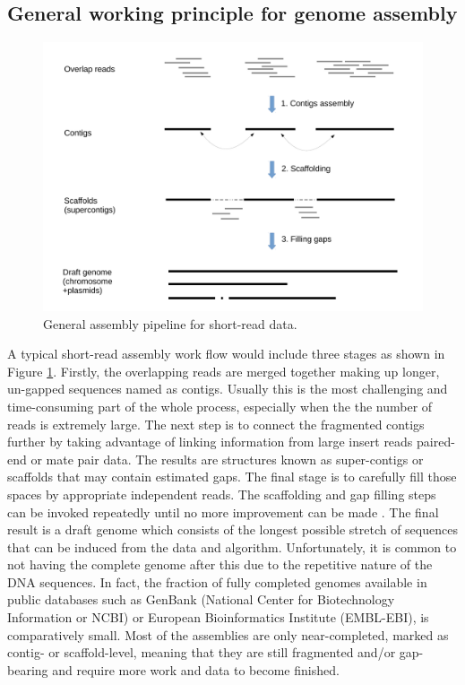 \subsection{General working principle for genome assembly}

\begin{figure}[ht!]
\centering
\includegraphics[width=.9\textwidth]{images/sassembly.pdf}
\caption{General assembly pipeline for short-read data.}
\label{Fig:assembly}
\end{figure}

A typical short-read assembly work flow would include three stages as shown in Figure \ref{Fig:assembly}. Firstly, the overlapping reads are merged together making up longer, un-gapped sequences named as contigs. Usually this is the most challenging and time-consuming part of the whole process, especially when the the number of reads is extremely large. The next step is to connect the fragmented contigs further by taking advantage of linking information from large insert reads \EG{} paired-end or mate pair data. The results are structures known as super-contigs or scaffolds that may contain estimated gaps. The final stage is to carefully fill those spaces by appropriate independent reads. The scaffolding and gap filling steps can be invoked repeatedly until no more improvement can be made \cite{Tsai2010improving,Boetzer2012toward,Paulino2015sealer}. The final result is a draft genome which consists of the longest possible stretch of sequences that can be induced from the data and algorithm. Unfortunately, it is common to not having the complete genome after this due to the repetitive nature of the DNA sequences. In fact, the fraction of fully completed genomes available in public databases such as GenBank (National Center for Biotechnology Information or NCBI) or European Bioinformatics Institute (EMBL-EBI), is comparatively small. Most of the assemblies are only near-completed, marked as contig- or scaffold-level, meaning that they are still fragmented and/or gap-bearing and require more work and data to become finished. 

